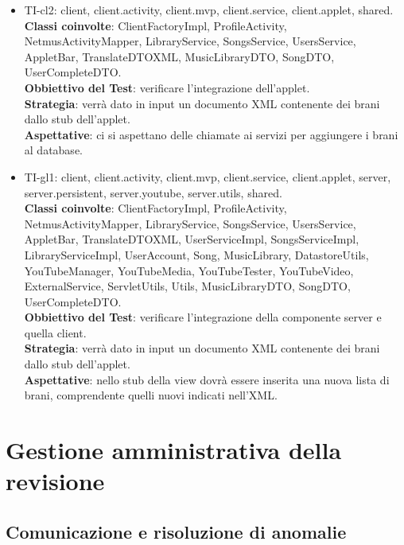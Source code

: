 \begin{itemize}
\item TI-cl2: client, client.activity, client.mvp, client.service,
client.applet, shared.\\ 
\textbf{Classi coinvolte}: ClientFactoryImpl, ProfileActivity,
NetmusActivityMapper, LibraryService, SongsService, UsersService, AppletBar,
TranslateDTOXML, MusicLibraryDTO, SongDTO, UserCompleteDTO.\\ 
\textbf{Obbiettivo del Test}: verificare l'integrazione dell'applet.\\
\textbf{Strategia}: verr\`a dato in input un documento XML contenente dei brani
dallo stub dell'applet.\\ 
\textbf{Aspettative}: ci si aspettano delle chiamate ai servizi per aggiungere
i brani al database.\\

\item TI-gl1: client, client.activity, client.mvp, client.service,
client.applet, server, server.persistent, server.youtube, server.utils, shared.\\ 
\textbf{Classi coinvolte}: ClientFactoryImpl, ProfileActivity,
NetmusActivityMapper, LibraryService, SongsService, UsersService, AppletBar,
TranslateDTOXML, UserServiceImpl, SongsServiceImpl,
LibraryServiceImpl, UserAccount, Song, MusicLibrary, DatastoreUtils,
YouTubeManager, YouTubeMedia, YouTubeTester, YouTubeVideo, ExternalService,
ServletUtils, Utils, MusicLibraryDTO, SongDTO, UserCompleteDTO.\\ 
\textbf{Obbiettivo del Test}: verificare l'integrazione della componente
server e quella client.\\
\textbf{Strategia}: verr\`a dato in input un documento XML contenente dei brani
dallo stub dell'applet.\\ 
\textbf{Aspettative}: nello stub della view dovr\`a essere inserita una nuova
lista di brani, comprendente quelli nuovi indicati nell'XML.\\ 

\end{itemize}


\chapter{Gestione amministrativa della \\revisione}
\thispagestyle{fancy} %

\section{Comunicazione e risoluzione di anomalie}

